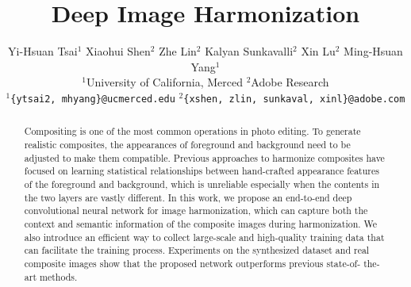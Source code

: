 \documentclass[10pt,twocolumn,letterpaper]{article}
\begin{document}
\title{Deep Image Harmonization}

\author{Yi-Hsuan Tsai$^{1}$
	\hspace{0.15in} Xiaohui Shen$^{2}$ \hspace{0.15in} Zhe Lin$^{2}$
	\hspace{0.15in} Kalyan Sunkavalli$^{2}$ \hspace{0.15in} Xin Lu$^{2}$
	\hspace{0.15in} Ming-Hsuan Yang$^{1}$
	\vspace{1mm} \\
	\hspace{0.1in} $^{1}$University of California, Merced \hspace{0.4in} $^{2}$Adobe Research
	\vspace{1mm} \\
	\hspace{0.1in} $^{1}${\tt\small \{ytsai2, mhyang\}@ucmerced.edu}
	\hspace{0.4in} $^{2}${\tt\small \{xshen, zlin, sunkaval, xinl\}@adobe.com}
}

\maketitle

\begin{abstract}
%
Compositing is one of the most common operations in photo editing.
%
To generate realistic composites, the appearances of foreground and background need to be adjusted to make them compatible.
%
Previous approaches to harmonize composites have focused on learning statistical relationships between hand-crafted appearance features of the foreground and background, which is unreliable especially when the contents in the two layers are vastly different.
%
In this work, we propose an end-to-end deep convolutional neural network for image harmonization, which can capture both the context
and semantic information of the composite images during harmonization.
%
We also introduce an efficient way to collect large-scale and high-quality training data that can facilitate the training process. 
%
Experiments on the synthesized dataset and real composite images show that the proposed network outperforms previous state-of-
the-art methods.
%
\end{abstract}

\end{document}
